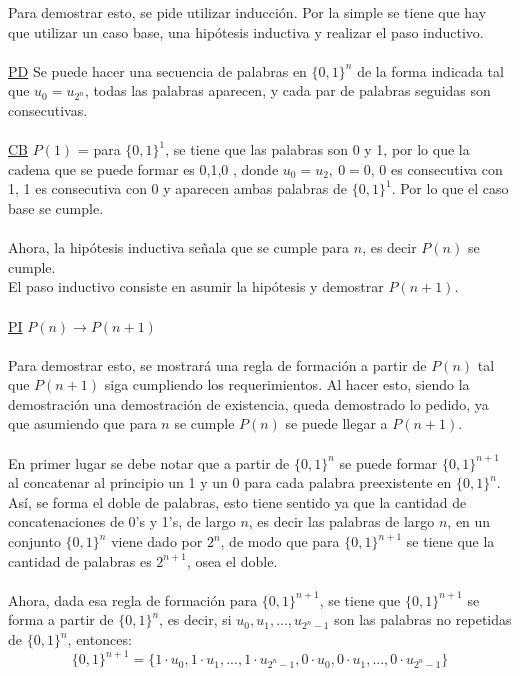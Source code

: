 \documentclass[letter]{article}
\begin{document}
	\begin{pregunta}{2}
		Para demostrar esto, se pide utilizar inducción. Por la simple se tiene que hay que utilizar un caso base, una hipótesis inductiva y realizar el paso inductivo.\\\\
		\underline{PD} Se puede hacer una secuencia de palabras en $\{0,1\}^n$ de la forma indicada tal que $u_0=u_{2^n}$, todas las palabras aparecen, y cada par de palabras seguidas son consecutivas.\\\\
		\underline{CB} $P(1)$ = para $\{0,1\}^1$, se tiene que las palabras son 0 y 1, por lo que la cadena que se puede formar es 0,1,0 , donde $u_0 = u_{2}, \ 0=0$, 0 es consecutiva con 1, 1 es consecutiva con 0 y  aparecen ambas palabras de $\{0,1\}^1$. Por lo que el caso base se cumple.\\\\
		Ahora, la hipótesis inductiva señala que se cumple para $n$, es decir $P(n)$ se cumple.\\
		El paso inductivo consiste en asumir la hipótesis y demostrar $P(n+1)$.\\\\
		\underline{PI} $P(n)\rightarrow P(n+1)$\\\\
		Para demostrar esto, se mostrará una regla de formación a partir de $P(n)$ tal que $P(n+1)$ siga cumpliendo los requerimientos. Al hacer esto, siendo la demostración una demostración de existencia, queda demostrado lo pedido, ya que asumiendo que para $n$ se cumple $P(n)$ se puede llegar a $P(n+1)$.\\\\
		En primer lugar se debe notar que a partir de $\{0,1\}^n$ se puede formar $\{0,1\}^{n+1}$ al concatenar al principio un 1 y un 0 para cada palabra preexistente en $\{0,1\}^n$. Así, se forma el doble de palabras, esto tiene sentido ya que la cantidad de concatenaciones de 0's y 1's, de largo $n$, es decir las palabras de largo $n$, en un conjunto $\{0,1\}^n$ viene dado por $2^n$, de modo que para $\{0,1\}^{n+1}$ se tiene que la cantidad de palabras es ${2^{n+1}}$, osea el doble.\\\\	
		Ahora, dada esa regla de formación para $\{0,1\}^{n+1}$, se tiene que $\{0,1\}^{n+1}$ se forma a partir de $\{0,1\}^n$, es decir, si $u_0, u_1, ..., u_{2^n-1}$ son las palabras no repetidas de $\{0,1\}^n$, entonces:
		$$\{0,1\}^{n+1} = \{1\cdot u_0, 1\cdot u_1, ..., 1\cdot u_{2^n-1},0\cdot u_0, 0\cdot u_1, ..., 0\cdot u_{2^n-1}\}$$

\end{pregunta}
\end{document}
